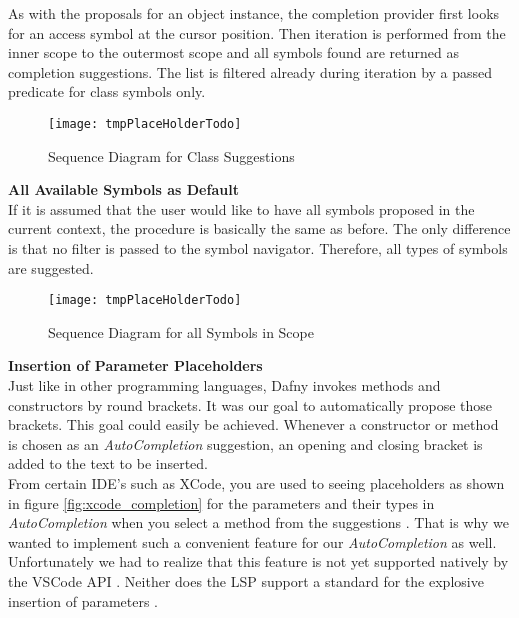 As with the proposals for an object instance,
the completion provider first looks for an access symbol at the cursor position.
Then iteration is performed from the inner scope
to the outermost scope and all symbols found are returned as completion suggestions.
The list is filtered already during iteration by a passed predicate for class symbols only.

\begin{figure}[H]
    \centering
    \texttt{[image: tmpPlaceHolderTodo]}
    \caption{Sequence Diagram for Class Suggestions}
    \label{fig:new_completion_diagram}
\end{figure}

\textbf{All Available Symbols as Default}\\
If it is assumed that the user would like to have all symbols proposed in the current context,
the procedure is basically the same as before.
The only difference is that no filter is passed to the symbol navigator.
Therefore, all types of symbols are suggested.

\begin{figure}[H]
    \centering
    \texttt{[image: tmpPlaceHolderTodo]}
    \caption{Sequence Diagram for all Symbols in Scope}
    \label{fig:default_completion_diagram}
\end{figure}


\textbf{Insertion of Parameter Placeholders}\\
Just like in other programming languages, Dafny invokes methods and constructors by round brackets.
It was our goal to automatically propose those brackets.
This goal could easily be achieved.
Whenever a constructor or method is chosen as an \textit{AutoCompletion} suggestion,
an opening and closing bracket is added to the text to be inserted. \\

From certain IDE's such as XCode,
you are used to seeing placeholders as shown in figure \ref{fig:xcode_completion} for the parameters and their types in \textit{AutoCompletion}
when you select a method from the suggestions \cite{sa}.
That is why we wanted to implement such a convenient feature for our \textit{AutoCompletion} as well.
Unfortunately we had to realize that this feature is not yet supported natively by the VSCode API \cite{vscodeAPI}.
Neither does the LSP support a standard for the explosive insertion of parameters \cite{lspspec}.

